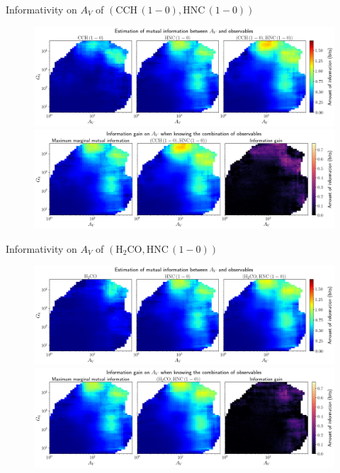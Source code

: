 \documentclass{beamer}
\begin{document}
\begin{frame}{Informativity on $A_V$ of $\left(\mathrm{CCH\,(1-0)},\mathrm{HNC\,(1-0)}\right)$}
    \begin{figure}
        \centering
        \includegraphics[width=0.95\linewidth]{../mi/av__cch10_hnc10_mi.png}
        \vfill
        \includegraphics[width=0.95\linewidth]{../mi/av__cch10_hnc10_mi_gain.png}
    \end{figure}
\end{frame}

\begin{frame}{Informativity on $A_V$ of $\left(\mathrm{H_2CO},\mathrm{HNC\,(1-0)}\right)$}
    \begin{figure}
        \centering
        \includegraphics[width=0.95\linewidth]{../mi/av__h2co_hnc10_mi.png}
        \vfill
        \includegraphics[width=0.95\linewidth]{../mi/av__h2co_hnc10_mi_gain.png}
    \end{figure}
\end{frame}
\end{document}
